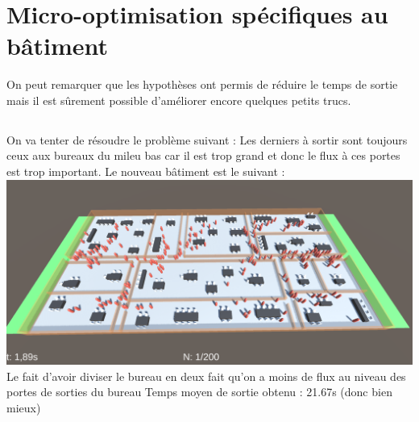 \documentclass[12pt]{article}
\begin{document}
\section{Micro-optimisation spécifiques au bâtiment}

On peut remarquer que les hypothèses ont permis de réduire le temps de sortie mais il est sûrement possible d'améliorer encore quelques petits trucs.

\subsection{}
On va tenter de résoudre le problème suivant : Les derniers à sortir sont toujours ceux aux bureaux du mileu bas car il est trop grand et
donc le flux à ces portes est trop important.
\newline
Le nouveau bâtiment est le suivant :
\newline
\includegraphics[scale=0.3]{Batiment 4.1 - Visuel.png}
\newline
Le fait d'avoir diviser le bureau en deux fait qu'on a moins de flux au niveau des portes de sorties du bureau
\newline\newline
Temps moyen de sortie obtenu : 21.67s (donc bien mieux)
\end{document}
